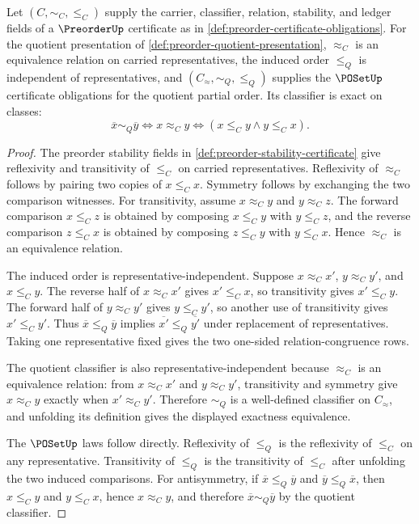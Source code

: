 \begin{theorem}
\label{thm:preorder-quotient-yields-poset}
Let $(C,\sim_C,\le_C)$ supply the carrier, classifier, relation, stability, and ledger fields of a $\PreorderUp$ certificate as in \autoref{def:preorder-certificate-obligations}. For the quotient presentation of \autoref{def:preorder-quotient-presentation}, $\approx_C$ is an equivalence relation on carried representatives, the induced order $\le_Q$ is independent of representatives, and $(C_{\!\approx},\sim_Q,\le_Q)$ supplies the $\POSetUp$ certificate obligations for the quotient partial order. Its classifier is exact on classes:
$$
\overline{x}\sim_Q\overline{y}
\Longleftrightarrow
x\approx_C y
\Longleftrightarrow
(x\le_C y\land y\le_C x).
$$
\end{theorem}
\begin{proof}
The preorder stability fields in \autoref{def:preorder-stability-certificate} give reflexivity and transitivity of $\le_C$ on carried representatives. Reflexivity of $\approx_C$ follows by pairing two copies of $x\le_C x$. Symmetry follows by exchanging the two comparison witnesses. For transitivity, assume $x\approx_C y$ and $y\approx_C z$. The forward comparison $x\le_C z$ is obtained by composing $x\le_C y$ with $y\le_C z$, and the reverse comparison $z\le_C x$ is obtained by composing $z\le_C y$ with $y\le_C x$. Hence $\approx_C$ is an equivalence relation.

The induced order is representative-independent. Suppose $x\approx_C x'$, $y\approx_C y'$, and $x\le_C y$. The reverse half of $x\approx_C x'$ gives $x'\le_C x$, so transitivity gives $x'\le_C y$. The forward half of $y\approx_C y'$ gives $y\le_C y'$, so another use of transitivity gives $x'\le_C y'$. Thus $\overline{x}\le_Q\overline{y}$ implies $\overline{x'}\le_Q\overline{y'}$ under replacement of representatives. Taking one representative fixed gives the two one-sided relation-congruence rows.

The quotient classifier is also representative-independent because $\approx_C$ is an equivalence relation: from $x\approx_C x'$ and $y\approx_C y'$, transitivity and symmetry give $x\approx_C y$ exactly when $x'\approx_C y'$. Therefore $\sim_Q$ is a well-defined classifier on $C_{\!\approx}$, and unfolding its definition gives the displayed exactness equivalence.

The $\POSetUp$ laws follow directly. Reflexivity of $\le_Q$ is the reflexivity of $\le_C$ on any representative. Transitivity of $\le_Q$ is the transitivity of $\le_C$ after unfolding the two induced comparisons. For antisymmetry, if $\overline{x}\le_Q\overline{y}$ and $\overline{y}\le_Q\overline{x}$, then $x\le_C y$ and $y\le_C x$, hence $x\approx_C y$, and therefore $\overline{x}\sim_Q\overline{y}$ by the quotient classifier.


\end{proof}
